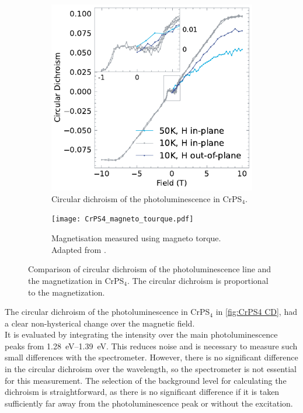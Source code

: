 \documentclass[
	twoside,
	parskip=half,
	a4paper,
]{scrbook}
\begin{document}
\begin{figure}
	\begin{subfigure}[t]{3.5in}
		\vskip 0pt
		\includegraphics{../figures/2023-12-14 CrPS4 circular dichroism.pdf}
		\caption{Circular dichroism of the photoluminescence in CrPS$_4$.}
		\label{fig:CrPS4 CD}
	\end{subfigure}
	\begin{subfigure}[t]{2.5in}
		\vskip 0pt
		\texttt{[image: CrPS4\_magneto\_tourque.pdf]}
		\caption{Magnetisation measured using magneto torque. Adapted from \cite[Figure 2]{CrPS4_magnetic}.}
		\label{fig:CrPS4 magnetic}
	\end{subfigure}
	\caption{Comparison of circular dichroism of the photoluminescence line and the magnetization in CrPS$_4$. The circular dichroism is proportional to the magnetization.}
\end{figure}
The circular dichroism of the photoluminescence in CrPS$_4$ in \autoref{fig:CrPS4 CD},
had a clear non-hysterical change over the magnetic field.\\
It is evaluated by integrating the intensity over the main photoluminescence peaks from \SIrange{1.28}{1.39}{eV}.
This reduces noise and is necessary to measure such small differences with the spectrometer.
However, there is no significant difference in the circular dichroism over the wavelength, so the spectrometer is not essential for this measurement.
The selection of the background level for calculating the dichroism is straightforward, as there is no significant difference if it is taken sufficiently far away from the photoluminescence peak or without the excitation.
\end{document}
